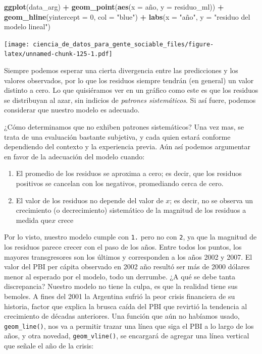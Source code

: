 \documentclass[]{book}
\newenvironment{Shaded}{\begin{snugshade}}{\end{snugshade}}
\newcommand{\KeywordTok}[1]{\textcolor[rgb]{0.13,0.29,0.53}{\textbf{#1}}}
\newcommand{\DataTypeTok}[1]{\textcolor[rgb]{0.13,0.29,0.53}{#1}}
\newcommand{\DecValTok}[1]{\textcolor[rgb]{0.00,0.00,0.81}{#1}}
\newcommand{\StringTok}[1]{\textcolor[rgb]{0.31,0.60,0.02}{#1}}
\newcommand{\OperatorTok}[1]{\textcolor[rgb]{0.81,0.36,0.00}{\textbf{#1}}}
\newcommand{\NormalTok}[1]{#1}
\providecommand{\tightlist}{%
  \setlength{\itemsep}{0pt}\setlength{\parskip}{0pt}}
\begin{document}
\begin{Shaded}
\begin{Highlighting}[]
\KeywordTok{ggplot}\NormalTok{(data_arg) }\OperatorTok{+}
\StringTok{    }\KeywordTok{geom_point}\NormalTok{(}\KeywordTok{aes}\NormalTok{(}\DataTypeTok{x =}\NormalTok{ año, }\DataTypeTok{y =}\NormalTok{ residuo_ml)) }\OperatorTok{+}
\StringTok{    }\KeywordTok{geom_hline}\NormalTok{(}\DataTypeTok{yintercept =} \DecValTok{0}\NormalTok{, }\DataTypeTok{col =} \StringTok{"blue"}\NormalTok{) }\OperatorTok{+}
\StringTok{    }\KeywordTok{labs}\NormalTok{(}\DataTypeTok{x =} \StringTok{"año"}\NormalTok{, }\DataTypeTok{y =} \StringTok{"residuo del modelo lineal"}\NormalTok{)}
\end{Highlighting}
\end{Shaded}

\texttt{[image: ciencia\_de\_datos\_para\_gente\_sociable\_files/figure-latex/unnamed-chunk-125-1.pdf]}

Siempre podemos esperar una cierta divergencia entre las predicciones y
los valores observados, por lo que los residuos siempre tendrán (en
general) un valor distinto a cero. Lo que quisiéramos ver en un gráfico
como este es que los residuos se distribuyan al azar, sin indicios de
\emph{patrones sistemáticos}. Si así fuere, podemos considerar que
nuestro modelo es adecuado.

¿Cómo determinamos que no exhiben patrones sistemáticos? Una vez mas, se
trata de una evaluación bastante subjetiva, y cada quien estará conforme
dependiendo del contexto y la experiencia previa. Aún así podemos
argumentar en favor de la adecuación del modelo cuando:

\begin{enumerate}
\def\labelenumi{\arabic{enumi}.}
\tightlist
\item
  El promedio de los residuos se aproxima a cero; es decir, que los
  residuos positivos se cancelan con los negativos, promediando cerca de
  cero.
\item
  El valor de los residuos no depende del valor de \(x\); es decir, no
  se observa un crecimiento (o decrecimiento) sistemático de la magnitud
  de los residuos a medida que\(x\) crece
\end{enumerate}

Por lo visto, nuestro modelo cumple con \texttt{1.} pero no con
\texttt{2}, ya que la magnitud de los residuos parece crecer con el paso
de los años. Entre todos los puntos, los mayores transgresores son los
últimos y corresponden a los años 2002 y 2007. El valor del PBI per
cápita observado en 2002 año resultó ser más de 2000 dólares menor al
esperado por el modelo, todo un derrumbe. ¿A qué se debe tanta
discrepancia? Nuestro modelo no tiene la culpa, es que la realidad tiene
sus bemoles. A fines del 2001 la Argentina sufrió la peor crisis
financiera de su historia, factor que explica la brusca caída del PBI
que revirtió la tendencia al crecimiento de décadas anteriores. Una
función que aún no habíamos usado, \texttt{geom\_line()}, nos va a
permitir trazar una línea que siga el PBI a lo largo de los años, y otra
novedad, \texttt{geom\_vline()}, se encargará de agregar una línea
vertical que señale el año de la crisis:
\end{document}
